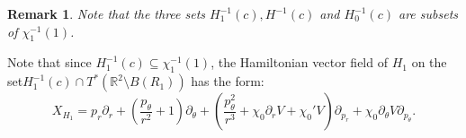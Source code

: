 \documentclass[a4paper]{amsart}
\newtheorem{rem}[thm]{Remark}%
\numberwithin{equation}{section}
\newcommand{\R}{\mathbb{R}}
\begin{document}
\begin{rem}\label{rem:relHvsH1}
Note that the three sets $H_1^{-1}(c), H^{-1}(c)$ and $H_0^{-1}(c)$ are subsets of $\chi_1^{-1}(1)$.
\end{rem}

Note that since $H_1^{-1}(c)\subseteq \chi_1^{-1}(1)$, the Hamiltonian vector field of $H_1$ on the set\linebreak $H_1^{-1}(c)\cap T^*(\R^2\setminus B(R_1))$ has the form:
\begin{equation}\label{defXH1}
X_{H_1}=p_r\partial_r+\left(\frac{p_\theta}{r^2}+1\right)\partial_\theta+\left(\frac{p_\theta^2}{r^3}+\chi_0\partial_rV+\chi_0' V\right)\partial_{p_r}+\chi_0 \partial_\theta V \partial_{p_\theta}.
\end{equation}
\end{document}

